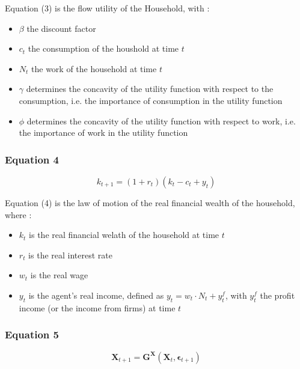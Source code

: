 \documentclass{article}
\begin{document}
Equation (3) is the flow utility of the Household, with : 
\begin{itemize}
    \item $\beta$ the discount factor
    \item $c_{t}$ the consumption of the houshold at time $t$
    \item $N_{t}$ the work of the household at time $t$
    \item $\gamma$ determines the concavity of the utility function with respect to the consumption, i.e. the importance of consumption in the utility function
    \item $\phi$ determines the concavity of the utility function with respect to work, i.e. the importance of work in the utility function
\end{itemize}


\subsubsection*{Equation 4}
\begin{equation}\tag{4}
    k_{t+1}=(1+r_t)(k_{t}-c_{t}+y_{t})
\end{equation}

Equation (4) is the law of motion of the real financial wealth of the household, where : 
\begin{itemize}
    \item $k_t$ is the real financial welath of the household at time $t$
    \item $r_t$ is the real interest rate
    \item $w_t$ is the real wage
    \item $y_t$ is the agent's real income, defined as $y_t=w_t\cdot N_{t}+y_{t}^{f}$, with $y_{t}^{f}$ the profit income (or the income from firms) at time $t$
\end{itemize}

\subsubsection*{Equation 5}

\begin{equation}\tag{5}
    \bm{X}_{t+1}=\bm{G}^{\bm{X}}\left(\bm{X}_{t},\bm{\epsilon}_{t+1}\right)
\end{equation}
\end{document}
